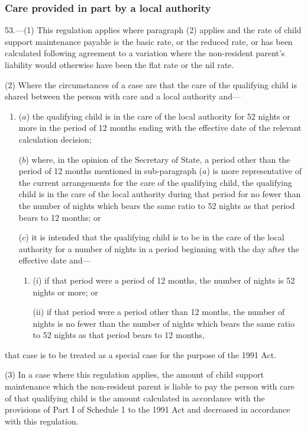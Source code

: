 \documentclass[12pt,a4paper]{article}
\begin{document}
\subsubsection[53. Care provided in part by a local authority]{Care provided in part by a local authority}

53.---(1)  This regulation applies where paragraph (2) applies and the rate of child support maintenance payable is the basic rate, or the reduced rate, or has been calculated following agreement to a variation where the non-resident parent’s liability would otherwise have been the flat rate or the nil rate.

(2) Where the circumstances of a case are that the care of the qualifying child is shared between the person with care and a local authority and—
\begin{enumerate}\item[]
($a$) the qualifying child is in the care of the local authority for 52 nights or more in the period of 12 months ending with the effective date of the relevant calculation decision;

($b$) where, in the opinion of the Secretary of State, a period other than the period of 12 months mentioned in sub-paragraph ($a$)  is more representative of the current arrangements for the care of the qualifying child, the qualifying child is in the care of the local authority during that period for no fewer than the number of nights which bears the same ratio to 52 nights as that period bears to 12 months; or

($c$) it is intended that the qualifying child is to be in the care of the local authority for a number of nights in a period beginning with the day after the effective date and—
\begin{enumerate}\item[]
(i) if that period were a period of 12 months, the number of nights is 52 nights or more; or

(ii) if that period were a period other than 12 months, the number of nights is no fewer than the number of nights which bears the same ratio to 52 nights as that period bears to 12 months,
\end{enumerate}
\end{enumerate}
that case is to be treated as a special case for the purpose of the 1991 Act.

(3) In a case where this regulation applies, the amount of child support maintenance which the non-resident parent is liable to pay the person with care of that qualifying child is the amount calculated in accordance with the provisions of Part I of Schedule 1 to the 1991 Act and decreased in accordance with this regulation.
\end{document}
